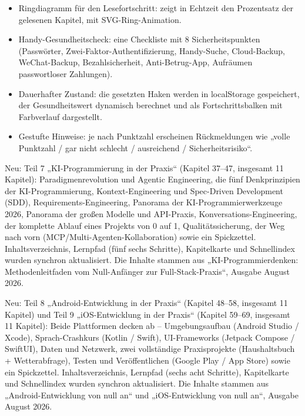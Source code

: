 \begin{itemize}
  \item Ringdiagramm für den Lesefortschritt: zeigt in Echtzeit den Prozentsatz der gelesenen Kapitel, mit SVG-Ring-Animation.
  \item Handy-Gesundheitscheck: eine Checkliste mit 8 Sicherheitspunkten (Passwörter, Zwei-Faktor-Authentifizierung, Handy-Suche, Cloud-Backup, WeChat-Backup, Bezahlsicherheit, Anti-Betrug-App, Aufräumen passwortloser Zahlungen).
  \item Dauerhafter Zustand: die gesetzten Haken werden in localStorage gespeichert, der Gesundheitswert dynamisch berechnet und als Fortschrittsbalken mit Farbverlauf dargestellt.
  \item Gestufte Hinweise: je nach Punktzahl erscheinen Rückmeldungen wie „volle Punktzahl / gar nicht schlecht / ausreichend / Sicherheitsrisiko“.
\end{itemize}


Neu: Teil 7 „KI-Programmierung in der Praxis“ (Kapitel 37–47, insgesamt 11 Kapitel): Paradigmenrevolution und Agentic Engineering, die fünf Denkprinzipien der KI-Programmierung, Kontext-Engineering und Spec-Driven Development (SDD), Requirements-Engineering, Panorama der KI-Programmierwerkzeuge 2026, Panorama der großen Modelle und API-Praxis, Konversations-Engineering, der komplette Ablauf eines Projekts von 0 auf 1, Qualitätssicherung, der Weg nach vorn (MCP/Multi-Agenten-Kollaboration) sowie ein Spickzettel. Inhaltsverzeichnis, Lernpfad (fünf sechs Schritte), Kapitelkarte und Schnellindex wurden synchron aktualisiert. Die Inhalte stammen aus „KI-Programmierdenken: Methodenleitfaden vom Null-Anfänger zur Full-Stack-Praxis“, Ausgabe August 2026.

Neu: Teil 8 „Android-Entwicklung in der Praxis“ (Kapitel 48–58, insgesamt 11 Kapitel) und Teil 9 „iOS-Entwicklung in der Praxis“ (Kapitel 59–69, insgesamt 11 Kapitel): Beide Plattformen decken ab – Umgebungsaufbau (Android Studio / Xcode), Sprach-Crashkurs (Kotlin / Swift), UI-Frameworks (Jetpack Compose / SwiftUI), Daten und Netzwerk, zwei vollständige Praxisprojekte (Haushaltsbuch + Wetterabfrage), Testen und Veröffentlichen (Google Play / App Store) sowie ein Spickzettel. Inhaltsverzeichnis, Lernpfad (sechs acht Schritte), Kapitelkarte und Schnellindex wurden synchron aktualisiert. Die Inhalte stammen aus „Android-Entwicklung von null an“ und „iOS-Entwicklung von null an“, Ausgabe August 2026.

